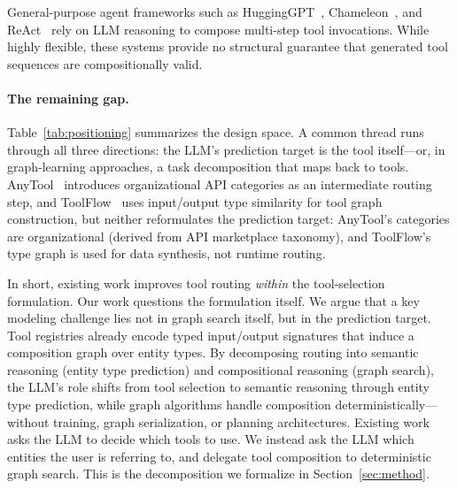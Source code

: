 General-purpose agent frameworks such as HuggingGPT~\cite{shen2023hugginggpt}, Chameleon~\cite{lu2023chameleon}, and ReAct~\cite{yao2023react} rely on LLM reasoning to compose multi-step tool invocations.
While highly flexible, these systems provide no structural guarantee that generated tool sequences are compositionally valid.

\paragraph{The remaining gap.}

Table~\ref{tab:positioning} summarizes the design space.
A common thread runs through all three directions: the LLM's prediction target is the tool itself---or, in graph-learning approaches, a task decomposition that maps back to tools.
AnyTool~\cite{du2024anytool} introduces organizational API categories as an intermediate routing step, and ToolFlow~\cite{wang2025toolflow} uses input/output type similarity for tool graph construction, but neither reformulates the prediction target: AnyTool's categories are organizational (derived from API marketplace taxonomy), and ToolFlow's type graph is used for data synthesis, not runtime routing.

In short, existing work improves tool routing \emph{within} the tool-selection formulation.
Our work questions the formulation itself.
We argue that a key modeling challenge lies not in graph search itself, but in the prediction target.
Tool registries already encode typed input/output signatures that induce a composition graph over entity types.
By decomposing routing into semantic reasoning (entity type prediction) and compositional reasoning (graph search), the LLM's role shifts from tool selection to semantic reasoning through entity type prediction, while graph algorithms handle composition deterministically---without training, graph serialization, or planning architectures.
Existing work asks the LLM to decide which tools to use.
We instead ask the LLM which entities the user is referring to, and delegate tool composition to deterministic graph search.
This is the decomposition we formalize in Section~\ref{sec:method}.
